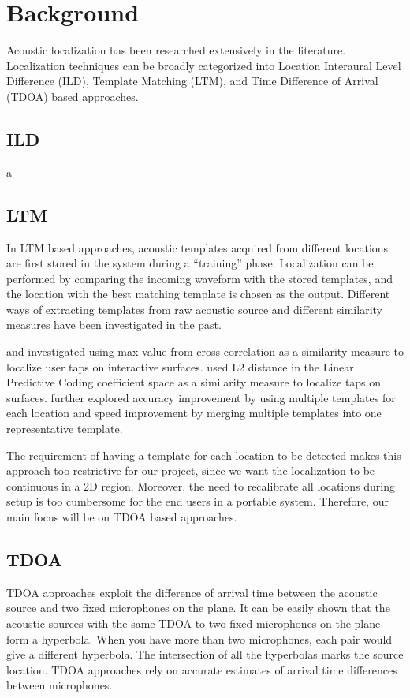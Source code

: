 \chapter{Background}
Acoustic localization has been researched extensively in the literature. Localization techniques can be broadly categorized into Location Interaural Level Difference (ILD), Template Matching (LTM), and Time Difference of Arrival (TDOA) based approaches.

\section{ILD}
a

\section{LTM}
In LTM based approaches, acoustic templates acquired from different locations are first stored in the system during a ``training'' phase. Localization can be performed by comparing the incoming waveform with the stored templates, and the location with the best matching template is chosen as the output. Different ways of extracting templates from raw acoustic source and different similarity measures have been investigated in the past. 

\cite{extended:tusi} and \cite{ltm:pham} investigated using max value from cross-correlation as a similarity measure to localize user taps on interactive surfaces. \cite{ltm:lpc} used L2 distance in the Linear Predictive Coding coefficient space as a similarity measure to localize taps on surfaces. \cite{ltm:tusi2} further explored accuracy improvement by using multiple templates for each location and speed improvement by merging multiple templates into one representative template.

The requirement of having a template for each location to be detected makes this approach too restrictive for our project, since we want the localization to be continuous in a 2D region.  Moreover, the need to recalibrate all locations during setup is too cumbersome for the end users in a portable system. Therefore, our main focus will be on TDOA based approaches.

\section{TDOA}
TDOA approaches exploit the difference of arrival time between the acoustic source and two fixed microphones on the plane. It can be easily shown that the acoustic sources with the same TDOA to two fixed microphones on the plane form a hyperbola. When you have more than two microphones, each pair would give a different hyperbola. The intersection of all the hyperbolas marks the source location. TDOA approaches rely on accurate estimates of arrival time differences between microphones. 

